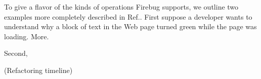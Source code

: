 To give a flavor of the kinds of operations Firebug supports, we outline two examples more completely
described in Ref.\cite{jjb-www2010}. First suppose a developer wants to understand why a block of text 
in the Web page turned green while the page was loading. More. 

Second, 

(Refactoring timeline)